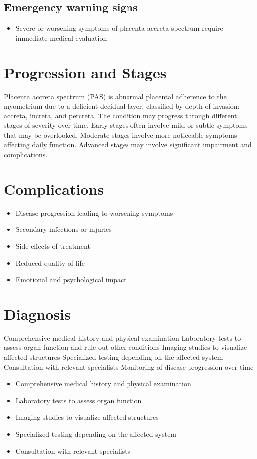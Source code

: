 \subsection{Emergency warning signs}
\begin{itemize}[noitemsep]
  \item Severe or worsening symptoms of placenta accreta spectrum require immediate medical evaluation
\end{itemize}
\section{Progression and Stages}
Placenta accreta spectrum (PAS) is abnormal placental adherence to the myometrium due to a deficient decidual layer, classified by depth of invasion: accreta, increta, and percreta. The condition may progress through different stages of severity over time. Early stages often involve mild or subtle symptoms that may be overlooked. Moderate stages involve more noticeable symptoms affecting daily function. Advanced stages may involve significant impairment and complications.
\section{Complications}
\begin{itemize}[noitemsep]
  \item Disease progression leading to worsening symptoms
  \item Secondary infections or injuries
  \item Side effects of treatment
  \item Reduced quality of life
  \item Emotional and psychological impact
\end{itemize}
\section{Diagnosis}
Comprehensive medical history and physical examination Laboratory tests to assess organ function and rule out other conditions Imaging studies to visualize affected structures Specialized testing depending on the affected system Consultation with relevant specialists Monitoring of disease progression over time

\begin{itemize}[noitemsep]
  \item Comprehensive medical history and physical examination
  \item Laboratory tests to assess organ function
  \item Imaging studies to visualize affected structures
  \item Specialized testing depending on the affected system
  \item Consultation with relevant specialists
\end{itemize}
